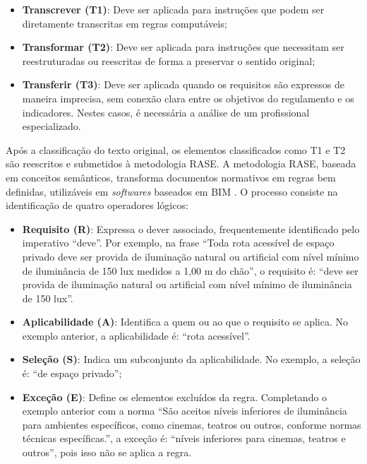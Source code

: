 \begin{itemize}
    \item \textbf{Transcrever (T1)}: Deve ser aplicada para instruções que podem ser diretamente transcritas em regras computáveis; 
    \item \textbf{Transformar (T2)}: Deve ser aplicada para instruções que necessitam ser reestruturadas ou reescritas de forma a preservar o sentido original;
    \item \textbf{Transferir (T3)}: Deve ser aplicada quando os requisitos são expressos de maneira imprecisa, sem conexão clara entre os objetivos do regulamento e os indicadores. Nestes casos, é necessária a análise de um profissional especializado.
\end{itemize}

Após a classificação do texto original, os elementos classificados como T1 e T2 são reescritos e submetidos à metodologia RASE. A metodologia RASE, baseada em conceitos semânticos, transforma documentos normativos em regras bem definidas, utilizáveis em \textit{softwares} baseados em BIM \cite{hjelseth2011}. O processo consiste na identificação de quatro operadores lógicos:

\begin{itemize}
    \item \textbf{Requisito (R)}: Expressa o dever associado, frequentemente identificado pelo imperativo “deve”. Por exemplo, na frase “Toda rota acessível de espaço privado deve ser provida de iluminação natural ou artificial com nível mínimo de iluminância de 150 lux medidos a 1,00 m do chão”, o requisito é: “deve ser provida de iluminação natural ou artificial com nível mínimo de iluminância de 150 lux”.
    \item \textbf{Aplicabilidade (A)}: Identifica a quem ou ao que o requisito se aplica. No exemplo anterior, a aplicabilidade é: “rota acessível”.
    \item \textbf{Seleção (S)}: Indica um subconjunto da aplicabilidade. No exemplo, a seleção é: “de espaço privado”;
    \item \textbf{Exceção (E)}: Define os elementos excluídos da regra. Completando o exemplo anterior com a norma “São aceitos níveis inferiores de iluminância para ambientes específicos, como cinemas, teatros ou outros, conforme normas técnicas específicas.”, a exceção é: “níveis inferiores para cinemas, teatros e outros”, pois isso não se aplica a regra. 
\end{itemize}

